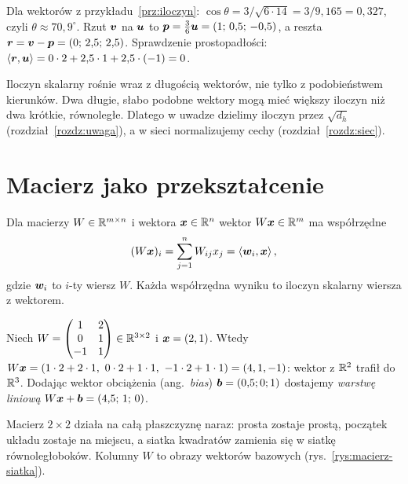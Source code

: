 \begin{naliczbach}
Dla wektorów z przykładu~\ref{prz:iloczyn}: $\cos\theta=3/\sqrt{6\cdot14}=3/9{,}165=0{,}327$, czyli $\theta\approx70{,}9^\circ$.
Rzut $\bm{v}$ na $\bm{u}$ to $\bm{p}=\frac{3}{6}\bm{u}=(1;\,0{,}5;\,-0{,}5)$, a reszta $\bm{r}=\bm{v}-\bm{p}=(0;\,2{,}5;\,2{,}5)$.
Sprawdzenie prostopadłości: $\left\langle \bm{r},\bm{u}\right\rangle=0\cdot2+2{,}5\cdot1+2{,}5\cdot(-1)=0$. \checkmark
\end{naliczbach}

\begin{pulapka}
Iloczyn skalarny rośnie wraz z długością wektorów, nie tylko z podobieństwem kierunków. Dwa długie, słabo
podobne wektory mogą mieć większy iloczyn niż dwa krótkie, równoległe. Dlatego w uwadze dzielimy iloczyn przez
$\sqrt{d_h}$ (rozdział~\ref{rozdz:uwaga}), a w sieci normalizujemy cechy (rozdział~\ref{rozdz:siec}).
\end{pulapka}

\section{Macierz jako przekształcenie}

\begin{definicja}\label{def:macierz-wektor}
Dla macierzy $W\in\mathbb{R}^{m\times n}$ i wektora $\bm{x}\in\mathbb{R}^n$ wektor $W\bm{x}\in\mathbb{R}^m$ ma współrzędne
\begin{equation}
  (W\bm{x})_i=\sum_{j=1}^{n}W_{ij}x_j=\left\langle \bm{w}_i,\bm{x}\right\rangle,
\end{equation}
gdzie $\bm{w}_i$ to $i$-ty wiersz $W$. Każda współrzędna wyniku to iloczyn skalarny wiersza z wektorem.
\end{definicja}

\begin{przyklad}\label{prz:macierz-wektor}
Niech $W=\begin{pmatrix}1&2\\0&1\\-1&1\end{pmatrix}\in\mathbb{R}^{3\times2}$ i $\bm{x}=(2,1)$. Wtedy
$W\vect x=(1\cdot2+2\cdot1,\ 0\cdot2+1\cdot1,\ -1\cdot2+1\cdot1)=(4,1,-1)$: wektor z $\mathbb{R}^2$ trafił do $\mathbb{R}^3$.
Dodając wektor obciążenia (ang.\ \emph{bias}) $\bm{b}=(0{,}5;0;1)$ dostajemy \emph{warstwę liniową}
$W\bm{x}+\bm{b}=(4{,}5;\,1;\,0)$.
\end{przyklad}

\begin{intuicja}
Macierz $2\times2$ działa na całą płaszczyznę naraz: prosta zostaje prostą, początek układu zostaje na miejscu, a
siatka kwadratów zamienia się w siatkę równoległoboków. Kolumny $W$ to obrazy wektorów bazowych (rys.~\ref{rys:macierz-siatka}).
\end{intuicja}

